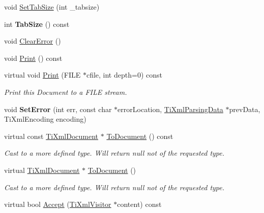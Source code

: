 \begin{DoxyCompactItemize}
void \hyperlink{class_ti_xml_document_a51dac56316f89b35bdb7d0d433ba988e}{Set\+Tab\+Size} (int \+\_\+tabsize)
\item 
\hypertarget{class_ti_xml_document_a81e6ffeee8f5d025a171eabf79abdad7}{}\label{class_ti_xml_document_a81e6ffeee8f5d025a171eabf79abdad7} 
int {\bfseries Tab\+Size} () const
\item 
void \hyperlink{class_ti_xml_document_ac66b8c28db86363315712a3574e87c35}{Clear\+Error} ()
\item 
void \hyperlink{class_ti_xml_document_aa4e8c1498a76dcde7191c683e1220882}{Print} () const
\item 
\hypertarget{class_ti_xml_document_aa9e166fae51da603641380a964f21eeb}{}\label{class_ti_xml_document_aa9e166fae51da603641380a964f21eeb} 
virtual void \hyperlink{class_ti_xml_document_aa9e166fae51da603641380a964f21eeb}{Print} (F\+I\+LE $\ast$cfile, int depth=0) const
\begin{DoxyCompactList}\small\item\em Print this Document to a F\+I\+LE stream. \end{DoxyCompactList}\item 
\hypertarget{class_ti_xml_document_a735c23e318597b920c94eae77fa206de}{}\label{class_ti_xml_document_a735c23e318597b920c94eae77fa206de} 
void {\bfseries Set\+Error} (int err, const char $\ast$error\+Location, \hyperlink{class_ti_xml_parsing_data}{Ti\+Xml\+Parsing\+Data} $\ast$prev\+Data, Ti\+Xml\+Encoding encoding)
\item 
\hypertarget{class_ti_xml_document_a468e582640e3c4f740f7168d8b4a6e4a}{}\label{class_ti_xml_document_a468e582640e3c4f740f7168d8b4a6e4a} 
virtual const \hyperlink{class_ti_xml_document}{Ti\+Xml\+Document} $\ast$ \hyperlink{class_ti_xml_document_a468e582640e3c4f740f7168d8b4a6e4a}{To\+Document} () const
\begin{DoxyCompactList}\small\item\em Cast to a more defined type. Will return null not of the requested type. \end{DoxyCompactList}\item 
\hypertarget{class_ti_xml_document_a1025d942a1f328fd742d545e37efdd42}{}\label{class_ti_xml_document_a1025d942a1f328fd742d545e37efdd42} 
virtual \hyperlink{class_ti_xml_document}{Ti\+Xml\+Document} $\ast$ \hyperlink{class_ti_xml_document_a1025d942a1f328fd742d545e37efdd42}{To\+Document} ()
\begin{DoxyCompactList}\small\item\em Cast to a more defined type. Will return null not of the requested type. \end{DoxyCompactList}\item 
virtual bool \hyperlink{class_ti_xml_document_a8ddd6eec722cbd25900bbac664909bac}{Accept} (\hyperlink{class_ti_xml_visitor}{Ti\+Xml\+Visitor} $\ast$content) const
\end{DoxyCompactItemize}
